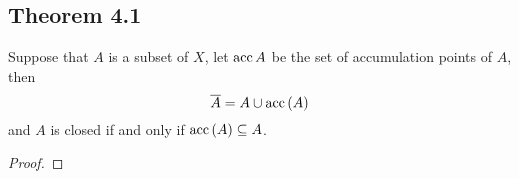 \documentclass[../../main.tex]{subfiles}
\begin{document}
\subsection{Theorem 4.1}
\begin{wts}
Suppose that $A$ is a subset of $X$, let $\operatorname{acc}{A}$ be the set of accumulation points of $A$, then
\begin{equation}
    \overline{A}=A\cup\operatorname{acc}{(A)}
\end{equation}
and $A$ is closed if and only if $\operatorname{acc}{(A)}\subseteq A$.
\end{wts}
\begin{proof}

\end{proof}
\end{document}

